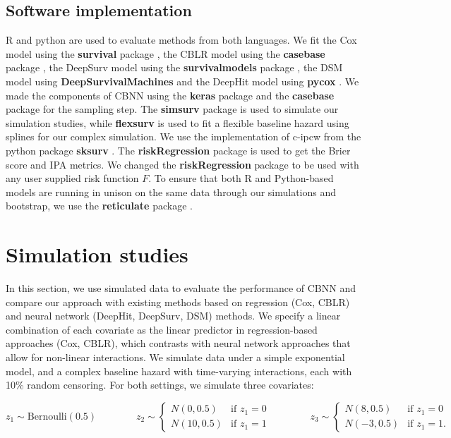 \documentclass[AMA,STIX1COL,]{WileyNJD-v2}
\begin{document}
\hypertarget{software-implementation}{%
\subsection{Software implementation}\label{software-implementation}}

R \citep{Rsoft} and python \citep{py} are used to evaluate methods from
both languages. We fit the Cox model using the \textbf{survival} package
\citep{survpkg}, the CBLR model using the \textbf{casebase} package
\citep{cbpkg}, the DeepSurv model using the \textbf{survivalmodels}
package \citep{survmods}, the DSM model using
\textbf{DeepSurvivalMachines} \citep{dsmPaper} and the DeepHit model
using \textbf{pycox} \citep{lee2018DeepHit}. We made the components of
CBNN using the \textbf{keras} \citep{keras} package and the
\textbf{casebase} package for the sampling step. The \textbf{simsurv}
package \citep{simsurv} is used to simulate our simulation studies,
while \textbf{flexsurv} \citep{flexsurv} is used to fit a flexible
baseline hazard using splines for our complex simulation. We use the
implementation of c-ipcw from the python package \textbf{sksurv}
\citep{sksurv}. The \textbf{riskRegression} package
\citep{riskRegression} is used to get the Brier score and IPA metrics.
We changed the \textbf{riskRegression} package to be used with any user
supplied risk function \(F\). To ensure that both R and Python-based
models are running in unison on the same data through our simulations
and bootstrap, we use the \textbf{reticulate} package
\citep{reticulate}.

\hypertarget{sims}{%
\section{Simulation studies}\label{sims}}

In this section, we use simulated data to evaluate the performance of
CBNN and compare our approach with existing methods based on regression
(Cox, CBLR) and neural network (DeepHit, DeepSurv, DSM) methods. We
specify a linear combination of each covariate as the linear predictor
in regression-based approaches (Cox, CBLR), which contrasts with neural
network approaches that allow for non-linear interactions. We simulate
data under a simple exponential model, and a complex baseline hazard
with time-varying interactions, each with 10\% random censoring. For
both settings, we simulate three covariates:

\[
z_{1} \sim \textrm{Bernoulli}(0.5) \qquad \qquad
z_{2} \sim \begin{cases}
 N(0,0.5) & \textrm{if } z_{1}=0\\ 
 N(10,0.5) & \textrm{if } z_{1}=1
\end{cases} \qquad \qquad
z_{3} \sim \begin{cases}
 N(8,0.5) & \textrm{if } z_{1}=0\\ 
 N(-3,0.5) & \textrm{if } z_{1}=1.
\end{cases}
\]
\end{document}
